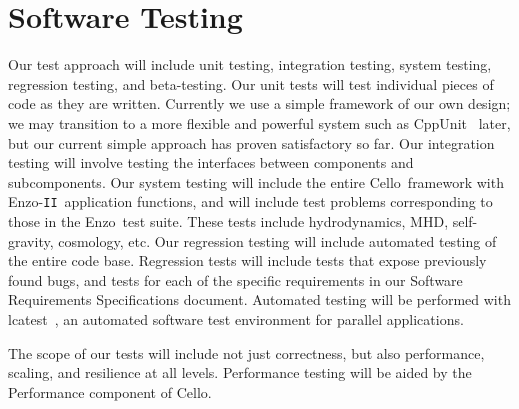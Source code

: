 \documentclass[11pt,letterpaper]{article}
\newcommand{\cello}{\textsf{Cello}}
\newcommand{\enzo}{\textsf{Enzo}}
\newcommand{\enzoii}{\textsf{Enzo}-\texttt{II}}
\newcommand{\lcatest}{\textsf{lcatest}}
\newcommand{\code}[1]{\textsf{#1}}
\begin{document}
\section{Software Testing} \label{s:testing}



Our test approach will include unit testing, integration testing,
system testing, regression testing, and beta-testing.  Our unit tests
will test individual pieces of code as they are written.  Currently we
use a simple framework of our own design; we may transition to a more
flexible and powerful system such as CppUnit~\cite{wwwcppunit} later,
but our current simple approach has proven satisfactory so far.  Our
integration testing will involve testing the interfaces between
components and subcomponents.  Our system testing will include the
entire \cello\ framework with \enzoii\ application functions, and will
include test problems corresponding to those in the \enzo\ test suite.
These tests include hydrodynamics, MHD, self-gravity, cosmology, etc.
Our regression testing will include automated testing of the entire
code base.  Regression tests will include tests that expose previously
found bugs, and tests for each of the specific requirements in our
Software Requirements Specifications document.  Automated testing will
be performed with \lcatest~\cite{wwwlcatest}, an automated software
test environment for parallel applications.

The scope of our tests will include not just correctness, but also
performance, scaling, and resilience at all levels.  Performance
testing will be aided by the \code{Performance} component of \cello.
\end{document}
